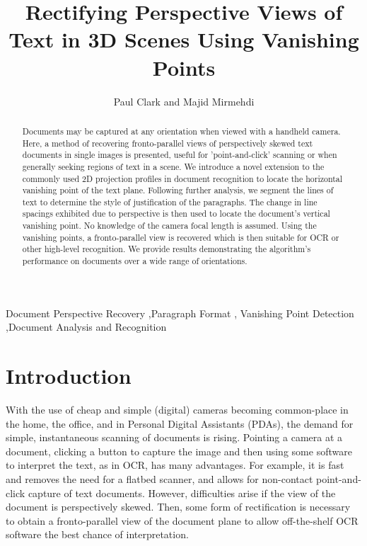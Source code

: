 \documentclass{elsart}   %
\begin{document}
\begin{frontmatter}

\title{Rectifying Perspective Views of Text in 3D Scenes Using Vanishing Points}

\author{Paul Clark and Majid Mirmehdi}  %

\address{
Department of Computer Science, University of Bristol, Bristol BS8 1UB, UK %
}

\begin{abstract}
Documents may be captured at any orientation when viewed with a handheld camera.
Here, a method of recovering  fronto-parallel views of perspectively skewed text
documents in single images is presented, useful for 'point-and-click' scanning
or when generally seeking regions of text in a scene.  We introduce a novel
extension to the commonly used 2D projection profiles in document recognition to
locate the horizontal vanishing point of the text plane.  Following further
analysis, we segment the lines of text to determine the style of justification
of the paragraphs.  The change in line spacings exhibited due to perspective is
then used to locate the document's vertical vanishing point. No knowledge of the
camera focal length is assumed. Using the vanishing points, a fronto-parallel
view is recovered which is then suitable for OCR or other high-level
recognition.  We provide results demonstrating the algorithm's performance on
documents over a wide range of orientations.
\end{abstract}

\begin{keyword}
Document Perspective Recovery  \sep Paragraph Format \sep 
Vanishing Point Detection \sep Document Analysis and Recognition 
\end{keyword}
\end{frontmatter}


\section{Introduction}
With the use of cheap and simple (digital) cameras becoming common-place in the
home, the office, and in Personal Digital Assistants (PDAs), the demand for
simple, instantaneous scanning of documents is rising. Pointing a camera at a
document, clicking a button to capture the image and then using some software to
interpret the text, as in OCR, has many advantages. For example, it is fast and
removes the need for a flatbed scanner, and allows for non-contact
point-and-click capture of text documents. However, difficulties arise if the
view of the document is perspectively skewed. Then, some form of rectification
is necessary to obtain a fronto-parallel view of the document plane to allow
off-the-shelf OCR software the best chance of interpretation.
\end{document}
